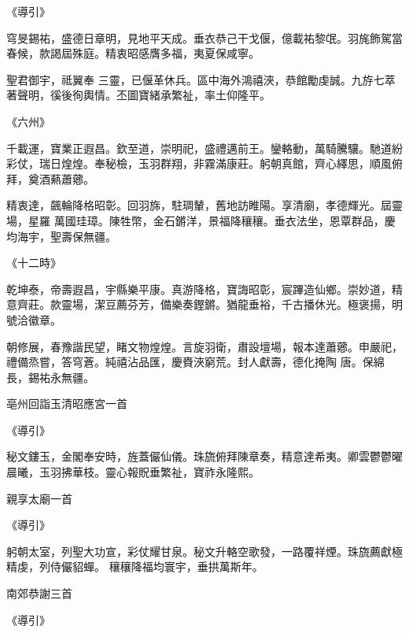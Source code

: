 \begin{pinyinscope}
 《導引》



 穹旻錫祐，盛德日章明，見地平天成。垂衣恭己干戈偃，億載祐黎氓。羽旄飾駕當春候，款謁屆殊庭。精衷昭感膺多福，夷夏保咸寧。



 聖君御宇，祗翼奉
 三靈，已偃革休兵。區中海外鴻禧浹，恭館勵虔誠。九斿七萃著聲明，徯後徇輿情。丕圖寶緒承繁祉，率土仰隆平。



 《六州》



 千載運，寶業正遐昌。欽至道，崇明祀，盛禮邁前王。鑾輅動，萬騎騰驤。馳道紛彩仗，瑞日煌煌。奉秘檢，玉羽群翔，非霧滿康莊。躬朝真館，齊心繹思，順風俯拜，奠酒爇蕭薌。



 精衷達，飆輪降格昭彰。回羽旆，駐琱輦，舊地訪睢陽。享清廟，孝德輝光。屆靈場，星羅
 萬國珪璋。陳牲幣，金石鏘洋，景福降穰穰。垂衣法坐，恩覃群品，慶均海宇，聖壽保無疆。



 《十二時》



 乾坤泰，帝壽遐昌，宇縣樂平康。真游降格，寶誨昭彰，宸蹕造仙鄉。崇妙道，精意齊莊。款靈場，潔豆薦芬芳，備樂奏鏗鏘。猶龍垂裕，千古播休光。極褒揚，明號洽徽章。



 朝修展，春豫諧民望，睹文物煌煌。言旋羽衛，肅設壇場，報本達蕭薌。申嚴祀，禮備烝嘗，答穹蒼。純禧沾品匯，慶賚浹窮荒。封人獻壽，德化掩陶
 唐。保綿長，錫祐永無疆。



 亳州回詣玉清昭應宮一首



 《導引》



 秘文鏤玉，金閣奉安時，旌蓋儼仙儀。珠旒俯拜陳章奏，精意達希夷。卿雲鬱鬱曜晨曦，玉羽拂華枝。靈心報貺垂繁祉，寶祚永隆熙。



 親享太廟一首



 《導引》



 躬朝太室，列聖大功宣，彩仗耀甘泉。秘文升輅空歌發，一路覆祥煙。珠旒薦獻極精虔，列侍儼貂蟬。
 穰穰降福均寰宇，垂拱萬斯年。



 南郊恭謝三首



 《導引》




\end{pinyinscope}
